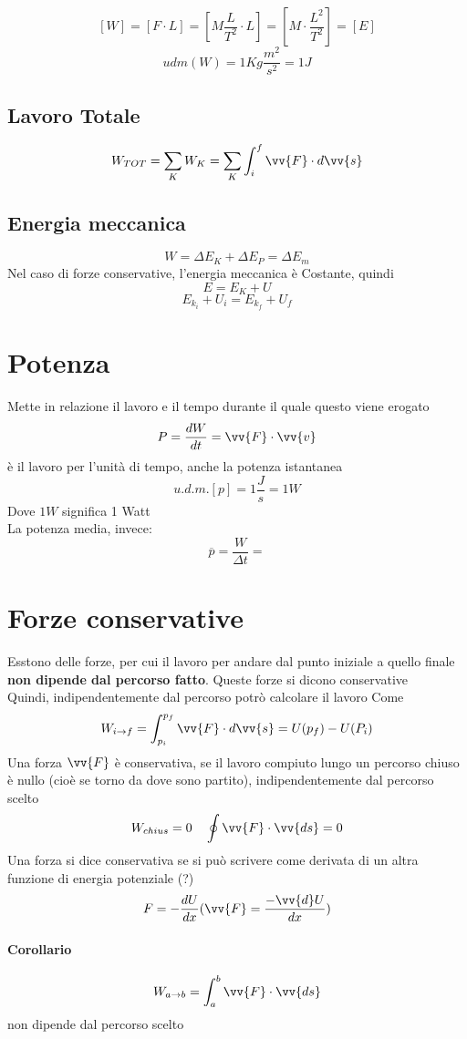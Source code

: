 \documentclass[a4paper]{report}
\begin{document}
  $$ [W] = [F \cdot L] = [M \frac{L}{T^2} \cdot L] = [M \cdot \frac{L^2}{T^2}] = [E] $$
  $$ udm(W) = 1 Kg \frac{m^2}{s^2} = 1J$$
  \subsection{Lavoro Totale}
  $$ W_{TOT} = \sum_K W_K = \sum_K \int_i^f \vv{F}\cdot d\vv{s} $$
  \subsection{Energia meccanica}
  $$ W = \Delta E_K + \Delta E_P = \Delta E_m $$
  Nel caso di forze conservative, l'energia meccanica è Costante, quindi
  $$ E = E_K + U $$
  $$ E_{k_i} + U_i = E_{k_f} + U_f$$

  \section{Potenza}
  Mette in relazione il lavoro e il tempo durante il quale questo viene erogato
  $$ P = \frac{dW}{dt} = \vv{F} \cdot \vv{v} $$
  è il lavoro per l'unità di tempo, anche la potenza istantanea
  $$ u.d.m.[p] = 1 \frac{J}{s} = 1W $$
  Dove $1W$ significa 1 Watt\\
  La potenza media, invece:
  $$ \overline{p} = \frac{W}{\Delta t} =  $$


  \section{Forze conservative}
  Esstono delle forze, per cui il lavoro per andare dal punto iniziale a quello finale \textbf{non dipende dal percorso fatto}. Queste forze si dicono conservative\\
  Quindi, indipendentemente dal percorso potrò calcolare il lavoro Come
  $$ W_{i \rightarrow f} = \int_{p_i}^{p_f} \vv{F} \cdot d\vv{s} = U(p_f) - U(P_i)$$
  Una forza $\vv{F}$ è conservativa, se il lavoro compiuto lungo un percorso chiuso è nullo (cioè se torno da dove sono partito), indipendentemente dal percorso scelto
  $$ W_{chius} = 0 \quad \oint \vv{F} \cdot \vv{ds} = 0 $$
  Una forza si dice conservativa se si può scrivere come derivata di un altra funzione di energia potenziale (?)
  $$ F= -\frac{dU}{dx} (\vv{F} = \frac{-\vv{d} U}{dx})$$
  \paragraph{Corollario}
  $$ W_{a \rightarrow b} = \int_a^b \vv{F}\cdot \vv{ds} $$
  non dipende dal percorso scelto
\end{document}
